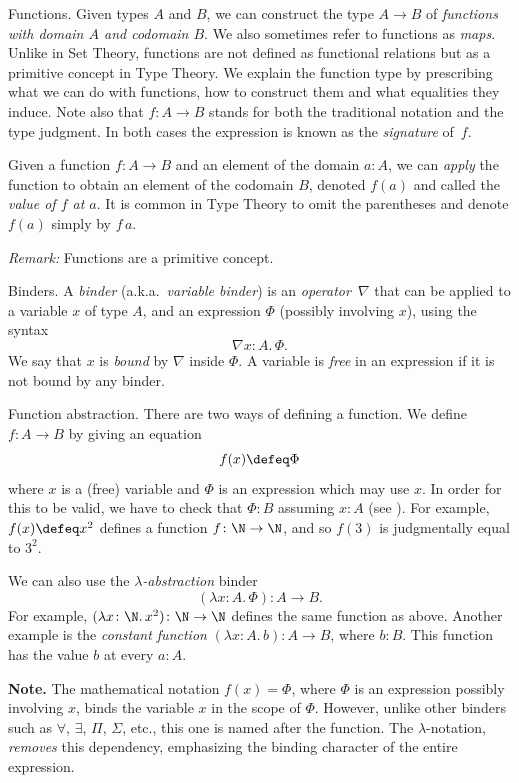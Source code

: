 \begin{lpar}{Functions.}
    Given types $A$ and $B$, we can construct the type $A\to B$ of \textsl{functions with domain $A$ and codomain $B$}. We also sometimes refer to functions as \textsl{maps}. Unlike in Set Theory, functions are not defined as functional relations but as a primitive concept in Type Theory. We explain the function type by prescribing what we can do with functions, how to construct them and what equalities they induce. Note also that $f\colon A\to B$ stands for both the traditional notation and the type judgment. In both cases the expression is known as the \textsl{signature} of~$f$.

    Given a function $f\colon A\to B$ and an element of the domain $a\colon A$, we can \textsl{apply} the function to obtain an element of the codomain $B$, denoted $f(a)$ and called the \textsl{value of\/ $f$ at\/ $a$}. It is common in Type Theory to omit the parentheses and denote $f(a)$ simply by $f\,a$.

    \textit{Remark:} Functions are a primitive concept.
\end{lpar}

\begin{lpar}{Binders.}\label{lpar:binders}
    A \textsl{binder} (a.k.a.~\textsl{variable binder}) is an \textit{operator}~$\nabla$ that can be applied to a variable $x$ of type $A$, and an expression $\Phi$ (possibly involving $x$), using the syntax
    \[
        \nabla x\colon A.\,\Phi.
    \]
    We say that $x$ is \textsl{bound} by $\nabla$ inside $\Phi$. A variable is \textsl{free} in an expression if it is not bound by any binder.
\end{lpar}

\begin{lpar}{Function abstraction.}
    There are two ways of defining a function. We define $f\colon A\to B$ by giving an equation
    \[
        f(x)\defeq\Phi
    \]
    where $x$ is a (free) variable and $\Phi$ is an expression which may use $x$. In order for this to be valid, we have to check that $\Phi\colon B$ assuming $x\colon A$ (see ). For example, $f(x)\defeq x^2$ defines a function $f\colon\N\to\N$, and so $f(3)$ is judgmentally equal to $3^2$.

    We can also use the \textsl{$\lambda$-abstraction} binder
    \[
        (\lambda x\colon A.\,\Phi)\colon A\to B.
    \]
    For example, $(\lambda x\colon\N.\,x^2)\colon\N\to\N$ defines the same function as above. Another example is the \textsl{constant function} $(\lambda x\colon A.\,b)\colon A\to B$, where $b\colon B$. This function has the value $b$ at every $a\colon A$.

    \textbf{Note.} The mathematical notation $f(x)=\Phi$, where $\Phi$ is an expression possibly involving $x$, binds the variable $x$ in the scope of $\Phi$. However, unlike other binders such as $\forall$, $\exists$, $\Pi$, $\Sigma$, etc., this one is named after the function. The $\lambda$-notation, \textit{removes} this dependency, emphasizing the binding character of the entire expression. 
\end{lpar}

